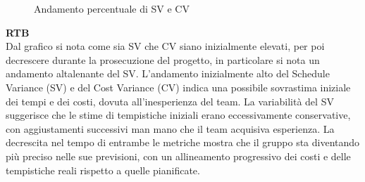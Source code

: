\begin{figure*}[!h]
    \caption{Andamento percentuale di SV e CV}
\end{figure*}
\begin{flushleft}
\textbf{RTB} \\
Dal grafico si nota come sia SV che CV siano inizialmente elevati, per poi decrescere durante la prosecuzione del progetto, in particolare si nota un andamento altalenante del SV. L'andamento inizialmente alto del Schedule Variance (SV) e del Cost Variance (CV) indica una possibile sovrastima iniziale dei tempi e dei costi, dovuta all'inesperienza del team. La variabilità del SV suggerisce che le stime di tempistiche iniziali erano eccessivamente conservative, con aggiustamenti successivi man mano che il team acquisiva esperienza. La decrescita nel tempo di entrambe le metriche mostra che il gruppo sta diventando più preciso nelle sue previsioni, con un allineamento progressivo dei costi e delle tempistiche reali rispetto a quelle pianificate. \\
\end{flushleft}

\newpage
